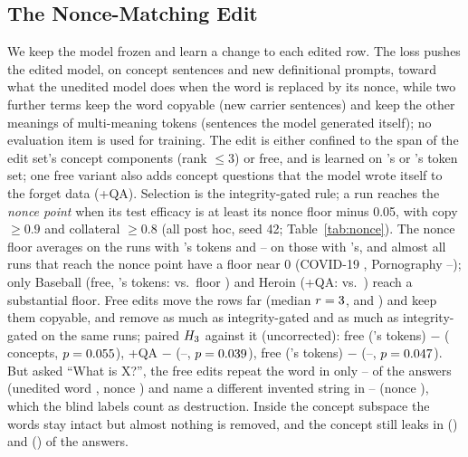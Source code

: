 \subsection{The Nonce-Matching Edit}
\label{app:nonce}
We keep the model frozen and learn a change to each edited row.
The loss pushes the edited model, on concept sentences and new definitional prompts, toward what the unedited model does when the word is replaced by its nonce, while two further terms keep the word copyable (new carrier sentences) and keep the other meanings of multi-meaning tokens (sentences the model generated itself); no evaluation item is used for training.
The edit is either confined to the span of the edit set's concept components (rank $\leq 3$) or free, and is learned on \cinder{}'s or \ember{}'s token set; one free variant also adds concept questions that the model wrote itself to the forget data (+QA).
Selection is the integrity-gated rule; a run reaches the \emph{nonce point} when its test efficacy is at least its nonce floor minus 0.05, with copy $\geq 0.9$ and collateral $\geq 0.8$ (all post hoc, seed 42; Table~\ref{tab:nonce}).
The nonce floor averages  on the runs with \cinder{}'s tokens and -- on those with \ember{}'s, and almost all runs that reach the nonce point have a floor near 0 (COVID-19 , Pornography --); only Baseball (free, \ember{}'s tokens:  vs.\ floor ) and Heroin (+QA:  vs.\ ) reach a substantial floor.
Free edits move the rows far (median $r = 3$,  and ) and keep them copyable, and remove  as much as integrity-gated \ember{} and  as much as integrity-gated \cinder{} on the same runs; paired $H_{3}$ against it (uncorrected): free (\cinder{}'s tokens) $-$ \cinderz{}  ( concepts, $p = 0.055$), +QA $-$ \cinderz{}  (--, $p = 0.039$), free (\ember{}'s tokens) $-$ \ember{}  (--, $p = 0.047$).
But asked ``What is X?'', the free edits repeat the word in only -- of the answers (unedited word , nonce ) and name a different invented string in -- (nonce ), which the blind labels count as destruction.
Inside the concept subspace the words stay intact but almost nothing is removed, and the concept still leaks in  (\cinder{}) and  (\ember{}) of the answers.

